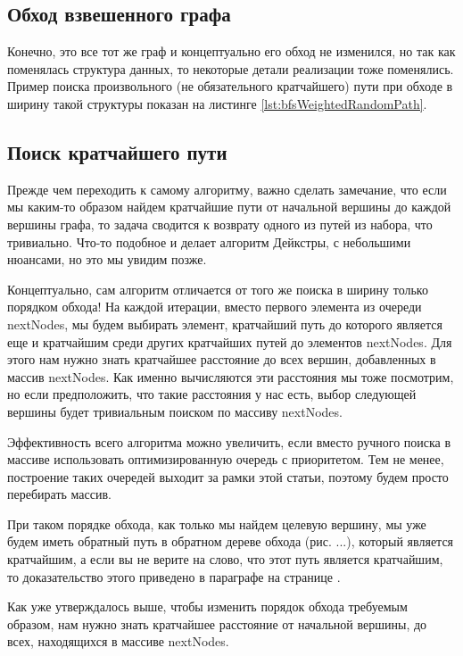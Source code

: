\documentclass[../../article.tex]{subfiles}
\begin{document}
\subsection{Обход взвешенного графа}

Конечно, это все тот же граф и концептуально его обход не изменился, но так как поменялась структура данных, то некоторые детали реализации тоже поменялись. Пример поиска произвольного (не обязательного кратчайшего) пути при обходе в ширину такой структуры показан на листинге \ref{lst:bfsWeightedRandomPath}.

\subsection{Поиск кратчайшего пути}

Прежде чем переходить к самому алгоритму, важно сделать замечание, что если мы каким-то образом найдем кратчайшие пути от начальной вершины до каждой вершины графа, то задача сводится к возврату одного из путей из набора, что тривиально. Что-то подобное и делает алгоритм Дейкстры, с небольшими нюансами, но это мы увидим позже.

Концептуально, сам алгоритм отличается от того же поиска в ширину только порядком обхода! На каждой итерации, вместо первого элемента из очереди nextNodes, мы будем выбирать элемент, кратчайший путь до которого является еще и кратчайшим среди других кратчайших путей до элементов nextNodes. Для этого нам нужно знать кратчайшее расстояние до всех вершин, добавленных в массив nextNodes. Как именно вычисляются эти расстояния мы тоже посмотрим, но если предположить, что такие расстояния у нас есть, выбор следующей вершины будет тривиальным поиском по массиву nextNodes.

Эффективность всего алгоритма можно увеличить, если вместо ручного поиска в массиве использовать оптимизированную очередь с приоритетом. Тем не менее, построение таких очередей выходит за рамки этой статьи, поэтому будем просто перебирать массив.

При таком порядке обхода, как только мы найдем целевую вершину, мы уже будем иметь обратный путь в обратном дереве обхода (рис. ...), который является кратчайшим, а если вы не верите на слово, что этот путь является кратчайшим, то доказательство этого приведено в параграфе на странице \pageref{dijkstraProve}.

Как уже утверждалось выше, чтобы изменить порядок обхода требуемым образом, нам нужно знать кратчайшее расстояние от начальной вершины, до всех, находящихся в массиве nextNodes.
\end{document}
